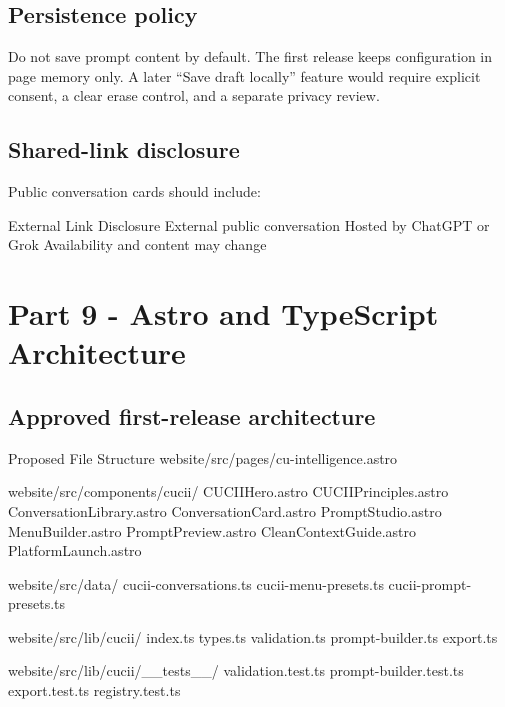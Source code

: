 \documentclass[11pt,letterpaper]{article}
\begin{document}
\subsection{Persistence policy}

Do not save prompt content by default. The first release keeps configuration in
page memory only. A later ``Save draft locally'' feature would require explicit
consent, a clear erase control, and a separate privacy review.

\subsection{Shared-link disclosure}

Public conversation cards should include:

\begin{codebox}{External Link Disclosure}
External public conversation
Hosted by ChatGPT or Grok
Availability and content may change
\end{codebox}

\section{Part 9 - Astro and TypeScript Architecture}

\subsection{Approved first-release architecture}

\begin{codebox}{Proposed File Structure}
website/src/pages/cu-intelligence.astro

website/src/components/cucii/
  CUCIIHero.astro
  CUCIIPrinciples.astro
  ConversationLibrary.astro
  ConversationCard.astro
  PromptStudio.astro
  MenuBuilder.astro
  PromptPreview.astro
  CleanContextGuide.astro
  PlatformLaunch.astro

website/src/data/
  cucii-conversations.ts
  cucii-menu-presets.ts
  cucii-prompt-presets.ts

website/src/lib/cucii/
  index.ts
  types.ts
  validation.ts
  prompt-builder.ts
  export.ts

website/src/lib/cucii/__tests__/
  validation.test.ts
  prompt-builder.test.ts
  export.test.ts
  registry.test.ts
\end{codebox}
\end{document}
